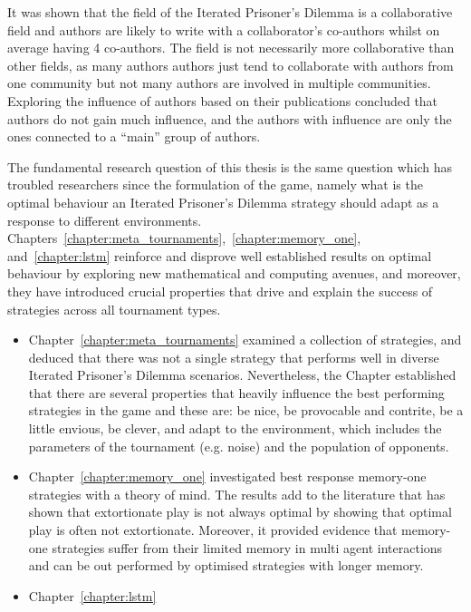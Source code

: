 It was shown that the field of the Iterated Prisoner's Dilemma is a
collaborative field and authors are likely to write with a collaborator's
co-authors whilst on average having 4 co-authors. The field is not
necessarily more collaborative than other fields, as many authors authors just
tend to collaborate with authors from one community but not many authors are
involved in multiple communities. Exploring the influence of authors based on
their publications concluded that authors do not gain much influence, and the
authors with influence are only the ones connected to a ``main'' group of
authors.

The fundamental research question of this thesis is the same question which has
troubled researchers since the formulation of the game, namely what is the
optimal behaviour an Iterated Prisoner's Dilemma strategy should adapt as a
response to different environments.
Chapters~\ref{chapter:meta_tournaments},~\ref{chapter:memory_one},
and~\ref{chapter:lstm} reinforce and disprove well established results on optimal
behaviour by
exploring new mathematical and computing avenues, and moreover, they have introduced
crucial properties that drive and explain the success of strategies across all
tournament types.

\begin{itemize}
    \item Chapter~\ref{chapter:meta_tournaments} examined a collection of
    \numberofstrategies strategies, and deduced that there was not a single
    strategy that performs well in diverse Iterated Prisoner’s Dilemma
    scenarios. Nevertheless, the Chapter established that there are several
    properties that heavily influence the best performing strategies in the game
    and these are: be nice, be provocable and contrite, be a little envious, be
    clever, and adapt to the environment, which includes the parameters of the
    tournament (e.g. noise) and the population of opponents.
    \item Chapter~\ref{chapter:memory_one} investigated best response memory-one
    strategies with a theory of mind. The results add to the 
    literature that has shown that extortionate play is not always optimal by
    showing that optimal play is often not extortionate. Moreover, it provided
    evidence that memory-one strategies suffer from their limited memory in
    multi agent interactions and can be out performed by optimised strategies
    with longer memory.
    \item Chapter~\ref{chapter:lstm} %
\end{itemize}

